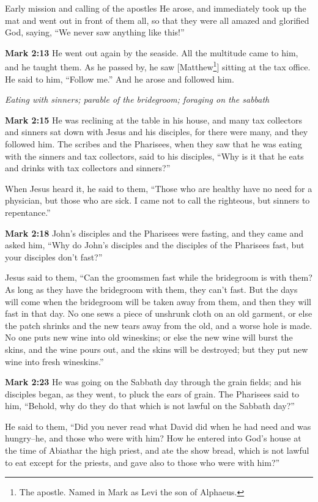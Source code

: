 \documentclass[10pt,twoside]{book}
\newcommand{\quotesize}{\normalsize{}}
\newenvironment{quotetext}{\begingroup\quotesize}{\endgroup}
\newcommand{\bible}[2]{\begin{quotetext}\textbf{#1} #2\end{quotetext}}
\newcommand{\gospelmark}[2]{\bible{Mark #1}{#2}}
\newcommand{\subhead}[1]{\emph{#1}\par}
\begin{document}
\begin{section}{Early mission and calling of the apostles}
{He arose, and immediately took up the mat and went out in front of them all, so that they were all amazed and glorified God, saying, ``We never saw anything like this!''}

\gospelmark{2:13}{He went out again by the seaside. All the multitude came to him, and he taught them.   As he passed by, he saw 
[Matthew\footnote{The apostle. Named in Mark as Levi the son of Alphaeus.}] sitting at the tax office. He said to him, ``Follow me.'' And he arose and followed him.}

\subhead{Eating with sinners; parable of the bridegroom; foraging on the sabbath}

\gospelmark{2:15}{  He was reclining at the table in his house, and many tax collectors and sinners sat down with Jesus and his disciples, for there were many, and they followed him.   The scribes and the Pharisees, when they saw that he was eating with the sinners and tax collectors, said to his disciples, ``Why is it that he eats and drinks with tax collectors and sinners?''

  When Jesus heard it, he said to them, ``Those who are healthy have no need for a physician, but those who are sick. I came not to call the righteous, but sinners to repentance.''}

\gospelmark{2:18}{John's disciples and the Pharisees were fasting, and they came and asked him, ``Why do John's disciples and the disciples of the Pharisees fast, but your disciples don't fast?''

  Jesus said to them, ``Can the groomsmen fast while the bridegroom is with them? As long as they have the bridegroom with them, they can't fast.    But the days will come when the bridegroom will be taken away from them, and then they will fast in that day.    No one sews a piece of unshrunk cloth on an old garment, or else the patch shrinks and the new tears away from the old, and a worse hole is made.    No one puts new wine into old wineskins; or else the new wine will burst the skins, and the wine pours out, and the skins will be destroyed; but they put new wine into fresh wineskins.'' }

\gospelmark{2:23}{He was going on the Sabbath day through the grain fields; and his disciples began, as they went, to pluck the ears of grain.   The Pharisees said to him, ``Behold, why do they do that which is not lawful on the Sabbath day?''

  He said to them, ``Did you never read what David did when he had need and was hungry--he, and those who were with him?    How he entered into God's house at the time of Abiathar the high priest, and ate the show bread, which is not lawful to eat except for the priests, and gave also to those who were with him?''

}
\end{section}
\end{document}
